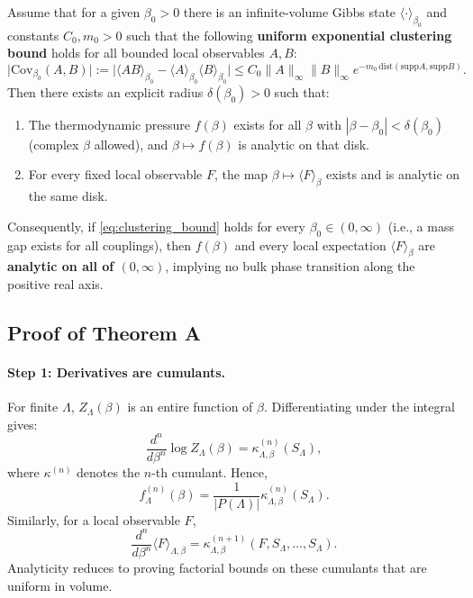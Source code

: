 \begin{theorem}
\label{thm:analyticity_clustering}
Assume that for a given $\beta_0 > 0$ there is an infinite-volume Gibbs state $\langle \cdot \rangle_{\beta_0}$ and constants $C_0, m_0 > 0$ such that the following \textbf{uniform exponential clustering bound} holds for all bounded local observables $A, B$:
\begin{equation}
\big| \mathrm{Cov}_{\beta_0}(A, B) \big| := \big| \langle AB \rangle_{\beta_0} - \langle A \rangle_{\beta_0} \langle B \rangle_{\beta_0} \big| \le C_0 \|A\|_\infty \|B\|_\infty e^{-m_0 \, \mathrm{dist}(\mathrm{supp} A, \mathrm{supp} B)}.
\label{eq:clustering_bound}
\end{equation}
Then there exists an explicit radius $\delta(\beta_0) > 0$ such that:
\begin{enumerate}
    \item The thermodynamic pressure $f(\beta)$ exists for all $\beta$ with $|\beta - \beta_0| < \delta(\beta_0)$ (complex $\beta$ allowed), and $\beta \mapsto f(\beta)$ is analytic on that disk.
    \item For every fixed local observable $F$, the map $\beta \mapsto \langle F \rangle_{\beta}$ exists and is analytic on the same disk.
\end{enumerate}
Consequently, if \eqref{eq:clustering_bound} holds for every $\beta_0 \in (0, \infty)$ (i.e., a mass gap exists for all couplings), then $f(\beta)$ and every local expectation $\langle F \rangle_\beta$ are \textbf{analytic on all of $(0, \infty)$}, implying no bulk phase transition along the positive real axis.
\end{theorem}

\subsection{Proof of Theorem A}

\paragraph{Step 1: Derivatives are cumulants.}
For finite $\Lambda$, $Z_\Lambda(\beta)$ is an entire function of $\beta$. Differentiating under the integral gives:
\begin{equation}
\frac{d^n}{d\beta^n} \log Z_\Lambda(\beta) = \kappa_{\Lambda, \beta}^{(n)}(S_\Lambda),
\end{equation}
where $\kappa^{(n)}$ denotes the $n$-th cumulant. Hence,
\begin{equation}
f_\Lambda^{(n)}(\beta) = \frac{1}{|P(\Lambda)|} \kappa_{\Lambda, \beta}^{(n)}(S_\Lambda).
\label{eq:pressure_cumulant}
\end{equation}
Similarly, for a local observable $F$,
\begin{equation}
\frac{d^n}{d\beta^n} \langle F \rangle_{\Lambda, \beta} = \kappa_{\Lambda, \beta}^{(n+1)}(F, S_\Lambda, \ldots, S_\Lambda).
\label{eq:observable_cumulant}
\end{equation}
Analyticity reduces to proving factorial bounds on these cumulants that are uniform in volume.

